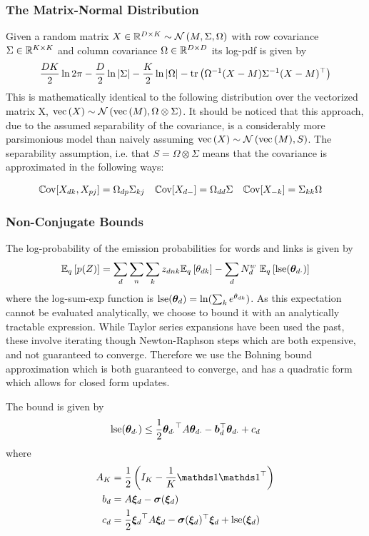 \subsubsection*{The Matrix-Normal Distribution}
Given a random matrix $X \in \MReal{D}{K} \sim \mnor{M}{\Sigma}{\Omega}$ with row covariance $\Sigma \in \MReal{K}{K}$ and column covariance $\Omega \in \MReal{D}{D}$ its log-pdf is given by
\begin{align}
\halve{DK}\ln 2\pi - \halve{D}\ln|\Sigma| - \halve{K} \ln|\Omega| -\Tr{\inv{\Omega}(X - M)\inv{\Sigma}(X - M)\T}
\end{align}
This is mathematically identical to the following distribution over the vectorized matrix X, $\vecf{X} \sim \nor{\vecf{M}}{\Omega \otimes \Sigma}$. It should be noticed that this approach, due to the assumed separability of the covariance, is a considerably more parsimonious model than naively assuming $\vecf{X} \sim \nor{\vecf{M}}{S}$. The separability assumption, i.e. that $S = \Omega \otimes \Sigma$ means that the covariance is approximated in the following ways:

\begin{align}
\cov{X_{dk}, X_{pj}} & = \Omega_{dp} \Sigma_{kj} &
\cov{X_{d-}} & = \Omega_{dd} \Sigma &
\cov{X_{-k}} & = \Sigma_{kk} \Omega 
\end{align}

\subsubsection*{Non-Conjugate Bounds}
The log-probability of the emission probabilities for words and links is given by
\begin{align}
\ex{p(Z)}{q} = \sum_d \sum_n \sum_k \zdnk \ex{\thdk}{q} - \sum_d N^w_d \text{ }\ex{\lse(\thdo)}{q}
\end{align}
where the log-sum-exp function is $\lse(\thd) = \ln (\sum_k e^\thdk)$. As this expectation cannot be evaluated analytically, we choose to bound it with an analytically tractable expression. While Taylor series expansions have been used the past\cite{Blei2006}\cite{Wang2013a}, these involve iterating though Newton-Raphson steps which are both expensive, and not guaranteed to converge. Therefore we use the Bohning bound approximation\cite{Bohning1988} which is both guaranteed to converge, and has a quadratic form which allows for closed form updates.

The bound is given by
\begin{align}
\lse(\thdo) \leq \half \thdo\T A \thdo - \vv{b}_d\T\thdo + c_d \label{eqn:lse-def}
\end{align}
where
\begin{align}
A_K & = \half \left( I_K - \frac{1}{K} \one \one\T \right) \\
b_d & = A \Ed - \vv{\sigma}(\Ed) \\
c_d & = \frac{1}{2} \Ed\T A \Ed - \vv{\sigma}(\Ed)\T\Ed + \lse(\Ed)
\end{align}

